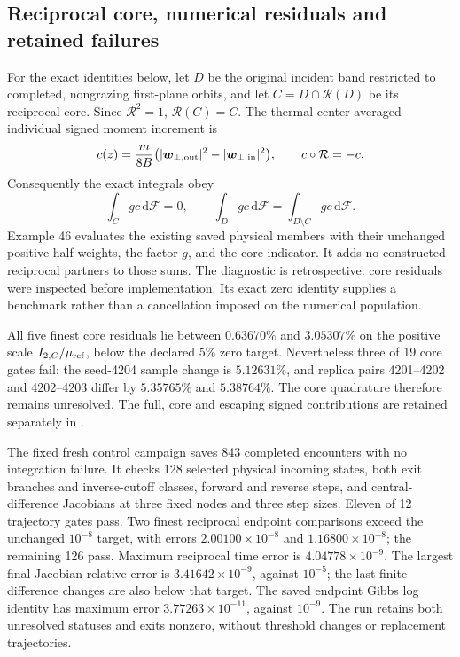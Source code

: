 \documentclass[11pt,letterpaper]{article}
\newcommand{\dd}{\mathrm d}
\begin{document}
\subsection*{Reciprocal core, numerical residuals and retained failures}
For the exact identities below, let $D$ be the original incident band
restricted to completed, nongrazing first-plane orbits, and let
$C=D\cap\mathcal R(D)$ be its reciprocal core. Since $\mathcal R^2=1$,
$\mathcal R(C)=C$. The thermal-center-averaged individual signed moment
increment is
\[
 c(z)=\frac{m}{8B}\bigl(|\bm w_{\perp,\rm out}|^2
                   -|\bm w_{\perp,\rm in}|^2\bigr),\qquad
 c\circ\mathcal R=-c.
\]
Consequently the exact integrals obey
\[
 \int_C gc\,\dd\mathcal F=0,\qquad
 \int_D gc\,\dd\mathcal F=
 \int_{D\setminus C}gc\,\dd\mathcal F.
\]
Example 46 evaluates the existing saved physical members with their
unchanged positive half weights, the factor $g$, and the core indicator.
It adds no constructed reciprocal partners to those sums. The diagnostic
is retrospective: core residuals were inspected before implementation.
Its exact zero identity supplies a benchmark rather than a cancellation
imposed on the numerical population.

All five finest core residuals lie between $0.63670\%$ and $3.05307\%$
on the positive scale $I_{2,C}/\mu_{\rm ref}$, below the declared $5\%$
zero target. Nevertheless three of 19 core gates fail: the seed-4204
sample change is $5.12631\%$, and replica pairs 4201--4202 and
4202--4203 differ by $5.35765\%$ and $5.38764\%$. The core quadrature
therefore remains unresolved. The full, core and escaping signed
contributions are retained separately in
.

The fixed fresh control campaign saves 843 completed encounters with no
integration failure. It checks 128 selected physical incoming states,
both exit branches and inverse-cutoff classes, forward and reverse
steps, and central-difference Jacobians at three fixed nodes and three
step sizes. Eleven of 12 trajectory gates pass. Two finest reciprocal
endpoint comparisons exceed the unchanged $10^{-8}$ target, with errors
$2.00100\times10^{-8}$ and $1.16800\times10^{-8}$; the remaining 126 pass.
Maximum reciprocal time error is $4.04778\times10^{-9}$.
The largest final Jacobian relative error is $3.41642\times10^{-9}$,
against $10^{-5}$; the last finite-difference changes are also below
that target. The saved endpoint Gibbs log identity has maximum error
$3.77263\times10^{-11}$, against $10^{-9}$. The run retains both
unresolved statuses and exits nonzero, without threshold changes or
replacement trajectories.
\end{document}
